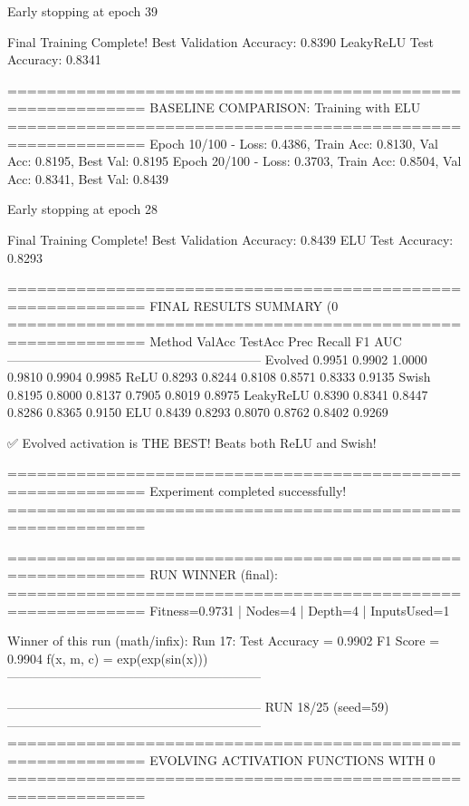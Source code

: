 Early stopping at epoch 39

Final Training Complete!
Best Validation Accuracy: 0.8390
LeakyReLU Test Accuracy: 0.8341

============================================================
BASELINE COMPARISON: Training with ELU
============================================================
Epoch  10/100 - Loss: 0.4386, Train Acc: 0.8130, Val Acc: 0.8195, Best Val: 0.8195
Epoch  20/100 - Loss: 0.3703, Train Acc: 0.8504, Val Acc: 0.8341, Best Val: 0.8439

Early stopping at epoch 28

Final Training Complete!
Best Validation Accuracy: 0.8439
ELU Test Accuracy: 0.8293

============================================================
FINAL RESULTS SUMMARY (0%
============================================================
Method             ValAcc     TestAcc    Prec       Recall     F1         AUC
------------------------------------------------------------
Evolved            0.9951     0.9902     1.0000     0.9810     0.9904     0.9985
ReLU               0.8293     0.8244     0.8108     0.8571     0.8333     0.9135
Swish              0.8195     0.8000     0.8137     0.7905     0.8019     0.8975
LeakyReLU          0.8390     0.8341     0.8447     0.8286     0.8365     0.9150
ELU                0.8439     0.8293     0.8070     0.8762     0.8402     0.9269

✅ Evolved activation is THE BEST! Beats both ReLU and Swish!

============================================================
Experiment completed successfully!
============================================================

============================================================
RUN WINNER (final):
============================================================
Fitness=0.9731 | Nodes=4 | Depth=4 | InputsUsed=1

Winner of this run (math/infix):
  Run 17:
     Test Accuracy = 0.9902
     F1 Score      = 0.9904
     f(x, m, c)    = exp(exp(sin(x)))
------------------------------------------------------------

------------------------------------------------------------
RUN 18/25 (seed=59)
------------------------------------------------------------
============================================================
EVOLVING ACTIVATION FUNCTIONS
WITH 0%
============================================================

